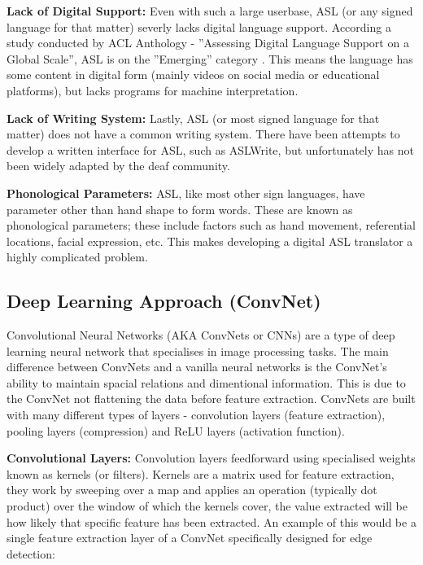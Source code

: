 \documentclass[11pt]{article}
\def\paraskip{\vskip 0.4cm}
\begin{document}
        \paraskip

        \noindent\textbf{Lack of Digital Support:} Even with such a large userbase, ASL (or any signed language for that matter) severly lacks digital language support. According a study conducted by ACL Anthology - ”Assessing Digital Language Support on a Global Scale”, ASL is on the ”Emerging” category \cite{ethnoASL}. This means the language has some content in digital form (mainly videos on social media or educational platforms), but lacks programs for machine interpretation.

        \paraskip

        \noindent\textbf{Lack of Writing System:} Lastly, ASL (or most signed language for that matter) does not have a common writing system. There have been attempts to develop a written interface for ASL, such as ASLWrite, but unfortunately has not been widely adapted by the deaf community.

        \paraskip

        \noindent\textbf{Phonological Parameters:} ASL, like most other sign languages, have parameter other than hand shape to form words. These are known as phonological parameters; these include factors such as hand movement, referential locations, facial expression, etc. This makes developing a digital ASL translator a highly complicated problem. 


    \subsection{Deep Learning Approach (ConvNet)}
        Convolutional Neural Networks (AKA ConvNets or CNNs) are a type of deep learning neural network that specialises in image processing tasks. The main difference between ConvNets and a vanilla neural networks is the ConvNet's ability to maintain spacial relations and dimentional information. This is due to the ConvNet not flattening the data before feature extraction. ConvNets are built with many different types of layers - convolution layers (feature extraction), pooling layers (compression) and ReLU layers (activation function).

        \paraskip

        \noindent\textbf{Convolutional Layers: } Convolution layers feedforward using specialised weights known as kernels (or filters). Kernels are a matrix used for feature extraction, they work by sweeping over a map and applies an operation (typically dot product) over the window of which the kernels cover, the value extracted will be how likely that specific feature has been extracted. An example of this would be a single feature extraction layer of a ConvNet specifically designed for edge detection: 
\end{document}

